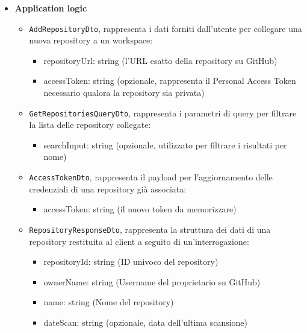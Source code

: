 \documentclass[a4paper, 11pt]{article}
\begin{document}
\begin{itemize}
  \item \textbf{Application logic}
    \begin{itemize}
      \item \texttt{AddRepositoryDto}, rappresenta i dati forniti dall'utente per collegare una nuova repository a un workspace:
      \begin{itemize}
          \item repositoryUrl: string (l'URL esatto della repository su GitHub)
          \item accessToken: string (opzionale, rappresenta il Personal Access Token necessario qualora la repository sia privata)
      \end{itemize}

      \item \texttt{GetRepositoriesQueryDto}, rappresenta i parametri di query per filtrare la lista delle repository collegate:
      \begin{itemize}
          \item searchInput: string (opzionale, utilizzato per filtrare i risultati per nome)
      \end{itemize}

      \item \texttt{AccessTokenDto}, rappresenta il payload per l'aggiornamento delle credenziali di una repository già associata:
      \begin{itemize}
          \item accessToken: string (il nuovo token da memorizzare)
      \end{itemize}

      \item \texttt{RepositoryResponseDto}, rappresenta la struttura dei dati di una repository restituita al client a seguito di un'interrogazione:
      \begin{itemize}
          \item repositoryId: string (ID univoco del repository)
          \item ownerName: string (Username del proprietario su GitHub)
          \item name: string (Nome del repository)
          \item dateScan: string (opzionale, data dell'ultima scansione)
      \end{itemize}
    \end{itemize}


\end{itemize}
\end{document}
